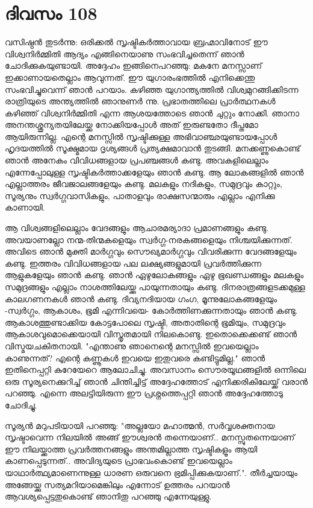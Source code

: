 \newpage
\section{ദിവസം 108}


വസിഷ്ഠന്‍ തുടര്‍ന്നു: ഒരിക്കല്‍ സൃഷ്ടികര്‍ത്താവായ ബ്രഹ്മാവിനോട്‌ ഈ വിശ്വനിര്‍മ്മിതി ആദ്യം എങ്ങിനെയാണു സംഭവിച്ചതെന്ന് ഞാന്‍ ചോദിക്കുകയുണ്ടായി. അദ്ദേഹം ഇങ്ങിനെപറഞ്ഞു: മകനേ മനസ്സാണ്‌ ഇക്കാണായതെല്ലാം ആവുന്നത്‌. ഈ യുഗാരംഭത്തില്‍ എനിക്കെന്തു സംഭവിച്ചുവെന്ന് ഞാന്‍ പറയാം. കഴിഞ്ഞ യുഗാന്ത്യത്തില്‍ വിശ്വമുറങ്ങിക്കിടന്ന രാത്രിയുടെ അന്ത്യത്തില്‍ ഞാനുണര്‍ ന്നു. പ്രഭാതത്തിലെ പ്രാര്‍ത്ഥനകള്‍ കഴിഞ്ഞ്‌ വിശ്വനിര്‍മ്മിതി എന്ന ആശയത്തോടെ ഞാന്‍ ചുറ്റും നോക്കി. ഞാനാ അനന്തശ്ശൂന്യതയിലേയ്ക്കു നോക്കിയപ്പോള്‍ അത്‌ ഇരുണ്ടതോ ദീപ്തമോ ആയിരുന്നില്ല. എന്റെ മനസ്സില്‍ സൃഷ്ടിക്കുള്ള അഭിവാഞ്ഛയുണ്ടായപ്പോള്‍ ഹൃദയത്തില്‍ സൂക്ഷ്മമായ ദൃശ്യങ്ങള്‍ പ്രത്യക്ഷമാവാന്‍ തുടങ്ങി. മനക്കണ്ണുകൊണ്ട്‌ ഞാന്‍ അനേകം വിവിധങ്ങളായ പ്രപഞ്ചങ്ങള്‍ കണ്ടു. അവകളിലെല്ലാം എന്നേപ്പോലുള്ള സൃഷ്ടികര്‍ത്താക്കളേയും ഞാന്‍ കണ്ടു. ആ ലോകങ്ങളില്‍ ഞാന്‍ എല്ലാത്തരം ജീവജാലങ്ങളേയും കണ്ടു. മലകളും നദികളും, സമുദ്രവും കാറ്റും, സൂര്യനും സ്വര്‍ഗ്ഗവാസികളും, പാതാളവും രാക്ഷസന്മാരും എല്ലാം എനിക്കു കാണായി.

ആ വിശ്വങ്ങളിലെല്ലാം വേദങ്ങളും ആചാരമര്യാദാ പ്രമാണങ്ങളും കണ്ടു. അവയാണല്ലോ നന്മ-തിന്മകളെയും സ്വര്‍ഗ്ഗ-നരകങ്ങളെയും നിശ്ചയിക്കുന്നത്‌. അവിടെ ഞാന്‍ മുക്തി മാര്‍ഗ്ഗവും സൌഖ്യമാര്‍ഗ്ഗവും വിവരിക്കുന്ന വേദങ്ങളേയും കണ്ടു. ഇത്തരം വിവിധങ്ങളായ പല ലക്ഷ്യങ്ങളുമായി പ്രവര്‍ത്തിക്കുന്ന ആളുകളേയും ഞാന്‍ കണ്ടു. ഞാന്‍ ഏഴുലോകങ്ങളും ഏഴു ഭൂഖണ്ഡങ്ങളും മലകളും സമുദ്രങ്ങളും എല്ലാം നാശത്തിലേയ്ക്കു പായുന്നതായും കണ്ടു. ദിനരാത്രങ്ങളടക്കമുള്ള കാലഗണനകള്‍ ഞാന്‍ കണ്ടു. ദിവ്യനദിയായ ഗംഗ, മൂന്നുലോകങ്ങളേയും -സ്വര്‍ഗ്ഗം, ആകാശം, ഭൂമി എന്നിവയെ- കോര്‍ത്തിണക്കുന്നതായും ഞാന്‍ കണ്ടു. ആകാശത്തുണ്ടാക്കിയ കോട്ടപോലെ സൃഷ്ടി, അതാതിന്റെ ഭൂമിയും, സമുദ്രവും ആകാശവുമൊക്കെയായി വിസ്തൃതമായി നിലകൊണ്ടു. ഇതൊക്കെക്കണ്ട്‌ ഞാന്‍ വിസ്മയചകിതനായി. "എന്താണു ഞാനെന്റെ മനസ്സില്‍ ഇവയെല്ലാം കാണുന്നത്‌? എന്റെ കണ്ണൂകള്‍ ഇവയെ ഇതുവരെ കണ്ടിട്ടുമില്ല." ഞാന്‍ ഇതിനെപ്പറ്റി കുറേയേറെ ആലോചിച്ചു. അവസാനം സൌരയൂഥങ്ങളില്‍ ഒന്നിലെ ഒരു സൂര്യനെക്കുറിച്ച്‌ ഞാന്‍ ചിന്തിച്ചിട്ട്‌ അദ്ദേഹത്തോട്‌ എനിക്കരികിലേയ്ക്ക്‌ വരാന്‍ പറഞ്ഞു. എന്നെ അലട്ടിയിരുന്ന ഈ പ്രശ്നത്തെപ്പറ്റി ഞാന്‍ അദ്ദേഹത്തോടു ചോദിച്ചു.

സൂര്യന്‍ മറുപടിയായി പറഞ്ഞു: "അല്ലയോ മഹാത്മന്‍, സര്‍വ്വശക്തനായ സൃഷ്ടാവെന്ന നിലയില്‍ അങ്ങ്‌ ഈശ്വരന്‍ തന്നെയാണ്‌.. മനസ്സുതന്നെയാണ്‌ ഈ നിലയ്ക്കാത്ത പ്രവര്‍ത്തനങ്ങളും അന്തമില്ലാത്ത സൃഷ്ടികളൂം ആയി കാണപ്പെടുന്നത്‌.. അവിദ്യയുടെ പ്രാഭവംകൊണ്ട്‌ ഇവയെല്ലാം യാഥാര്‍ത്ഥ്യമാണെന്നുള്ള ധാരണ ഒരുവനെ ഭ്രമിപ്പിക്കുകയാണ്‌.". തീര്‍ച്ചയായും അങ്ങേയ്ക്കു സത്യമറിയാമെങ്കിലും എന്നോട്‌ ഉത്തരം പറയാന്‍ ആവശ്യപ്പെട്ടതുകൊണ്ട്‌ ഞാനിതു പറഞ്ഞു എന്നേയുള്ളു.
